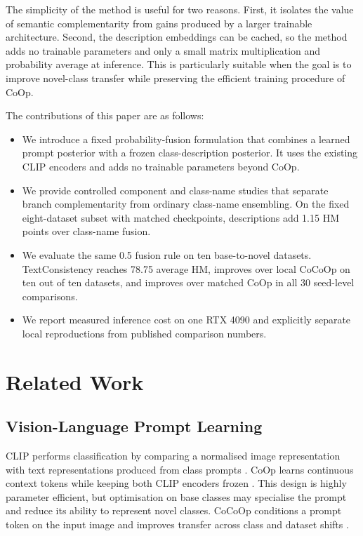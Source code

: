 \documentclass[preprint,12pt]{elsarticle}
\begin{document}
The simplicity of the method is useful for two reasons. First, it isolates the value of semantic complementarity from gains produced by a larger trainable architecture. Second, the description embeddings can be cached, so the method adds no trainable parameters and only a small matrix multiplication and probability average at inference. This is particularly suitable when the goal is to improve novel-class transfer while preserving the efficient training procedure of CoOp.

The contributions of this paper are as follows:
\begin{itemize}
    \item We introduce a fixed probability-fusion formulation that combines a learned prompt posterior with a frozen class-description posterior. It uses the existing CLIP encoders and adds no trainable parameters beyond CoOp.
    \item We provide controlled component and class-name studies that separate branch complementarity from ordinary class-name ensembling. On the fixed eight-dataset subset with matched checkpoints, descriptions add 1.15 HM points over class-name fusion.
    \item We evaluate the same 0.5 fusion rule on ten base-to-novel datasets. TextConsistency reaches 78.75 average HM, improves over local CoCoOp on ten out of ten datasets, and improves over matched CoOp in all 30 seed-level comparisons.
    \item We report measured inference cost on one RTX 4090 and explicitly separate local reproductions from published comparison numbers.
\end{itemize}

\section{Related Work}
\label{sec:related}

\subsection{Vision-Language Prompt Learning}

CLIP performs classification by comparing a normalised image representation with text representations produced from class prompts \cite{radford2021clip}. CoOp learns continuous context tokens while keeping both CLIP encoders frozen \cite{zhou2022coop}. This design is highly parameter efficient, but optimisation on base classes may specialise the prompt and reduce its ability to represent novel classes. CoCoOp conditions a prompt token on the input image and improves transfer across class and dataset shifts \cite{zhou2022cocoop}.
\end{document}
